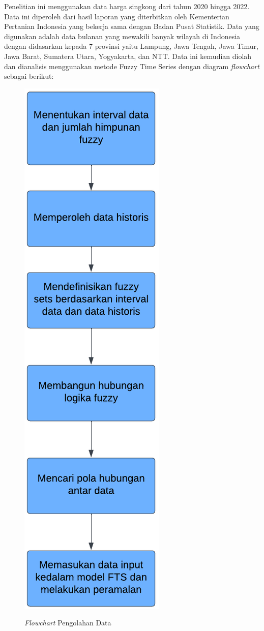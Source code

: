 \documentclass[conference]{IEEEtran}
\begin{document}
Penelitian ini menggunakan data harga singkong dari tahun 2020 hingga 2022. Data ini diperoleh dari hasil laporan yang diterbitkan oleh Kementerian Pertanian Indonesia yang bekerja sama dengan Badan Pusat Statistik. Data yang digunakan adalah data bulanan yang mewakili banyak wilayah di Indonesia dengan didasarkan kepada 7 provinsi yaitu Lampung, Jawa Tengah, Jawa Timur, Jawa Barat, Sumatera Utara, Yogyakarta, dan NTT. Data ini kemudian diolah dan dianalisis menggunakan metode Fuzzy Time Series dengan diagram \textit{flowchart} sebagai berikut:

\begin{figure}[htbp]
    \centering
    {\includegraphics[scale=0.7]{flowchart.png}} 
    \caption{\textit{Flowchart} Pengolahan Data}
\end{figure}
\end{document}
